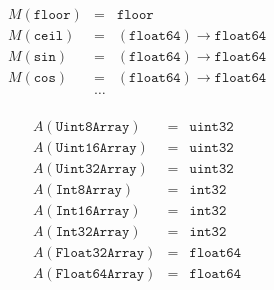 \documentclass{article}
\newcommand{\funty}[2]{({#1}) \rightarrow {#2}}
\newcommand{\ok}{\mathrm{\mathbf{ok}}}
\newcommand{\fjudge}[3]{{#1};{#2} \vdash {#3}\ \ok}
\newcommand{\uintfour}{\mathtt{uint32}}
\newcommand{\intfour}{\mathtt{int32}}
\newcommand{\double}{\mathtt{float64}}
\newcommand{\floor}{\mathtt{floor}}
\begin{document}
\[
\begin{array}{rcl}
M(\floor) & = & \floor \\
M(\mathtt{ceil}) & = & \funty{\double}{\double} \\
M(\mathtt{sin}) & = & \funty{\double}{\double} \\
M(\mathtt{cos}) & = & \funty{\double}{\double} \\
& \ldots \\
\end{array}
\]

\[
\begin{array}{rcl}
A(\mathtt{Uint8Array}) & = & \uintfour \\
A(\mathtt{Uint16Array}) & = & \uintfour \\
A(\mathtt{Uint32Array}) & = & \uintfour \\
A(\mathtt{Int8Array}) & = & \intfour \\
A(\mathtt{Int16Array}) & = & \intfour \\
A(\mathtt{Int32Array}) & = & \intfour \\
A(\mathtt{Float32Array}) & = & \double \\
A(\mathtt{Float64Array}) & = & \double \\
\end{array}
\]

\newcommand{\Pjudge}[1]{\vdash {#1}\ \ok}
\newcommand{\impjudge}[4]{{#1};{#2};{#3} \vdash {#4}\ \ok}
\newcommand{\fnjudge}[2]{{#1} \vdash {#2}\ \ok}
\newcommand{\expjudge}[2]{{#1} \vdash {#2}\ \ok}
\newcommand{\stmtjudge}[5]{{#1};{#2} \vdash {#3} : {#4} / {#5}}
\newcommand{\exprjudge}[3]{{#1} \vdash {#2} : {#3}}
\newcommand{\casejudge}[6]{{#1};{#2} \vdash {#3} : {#4}, {#5} / {#6}}
\end{document}
